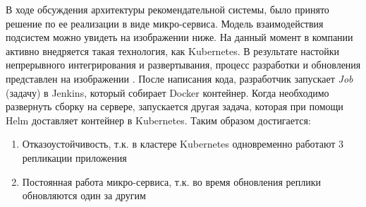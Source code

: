 В ходе обсуждения архитектуры рекомендательной системы, было принято решение по
ее реализации в виде микро-сервиса. Модель взаимодействия подсистем можно увидеть
на изображении ниже.
На данный момент в компании активно внедряется такая технология, как Kubernetes.
В результате настойки непрерывного интегрирования и развертывания, процесс
разработки и обновления представлен на изображении
.
После написания кода, разработчик запускает \textit{Job} (задачу) в Jenkins, который
собирает Docker контейнер. Когда необходимо развернуть сборку на сервере, запускается
другая задача, которая при помощи Helm доставляет контейнер в Kubernetes. Таким
образом достигается:
\begin{enumerate}
  \item Отказоустойчивость, т.к. в кластере Kubernetes одновременно работают
  3 репликации приложения
  \item Постоянная работа микро-сервиса, т.к. во время обновления реплики обновляются
  один за другим
\end{enumerate}
